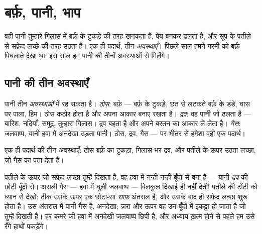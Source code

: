 \chapter{बर्फ़, पानी, भाप}\label{ch:g2:ice-water-steam}

वही पानी तुम्हारे गिलास में बर्फ़ के टुकड़े की तरह खनकता है, पेय बनकर
ढलता है, और सूप के पतीले से सफ़ेद लच्छे की तरह उठता है। एक ही पदार्थ,
तीन \emph{अवस्थाएँ}। पिछले साल हमने गरमी को बर्फ़ पिघलाते देखा था;
इस साल हम पानी की तीनों अवस्थाओं से मिलेंगे।

\section{पानी की तीन अवस्थाएँ}

\begin{example}\label{ex:g2:ice-water-steam:where}
पानी तीन \emph{अवस्थाओं} में रह सकता है। \emph{ठोस}: बर्फ़ ---
बर्फ़ के टुकड़े, छत से लटकते बर्फ़ के डंडे, घास पर पाला, हिम। ठोस
कठोर होता है और अपना आकार बनाए रखता है। \emph{द्रव}: वह पानी जो ढलता
है --- बारिश, नदियाँ, समुद्र, तुम्हारा गिलास। द्रव बहता है और अपने
बरतन का आकार ले लेता है। \emph{गैस}: जलवाष्प, यानी हवा में अनदेखा
उड़ता पानी। ठोस, द्रव, गैस --- पर भीतर से हमेशा वही एक पदार्थ।
\end{example}

\begin{omfigure}

{\small एक ही पदार्थ की तीन अवस्थाएँ: ठोस बर्फ़ का टुकड़ा, गिलास भर
द्रव, और पतीले के ऊपर उठता लच्छा, जो गैस का पता देता है।}
\end{omfigure}

\begin{remark}\label{rem:g2:ice-water-steam:invisible}
पतीले के ऊपर जो सफ़ेद लच्छा तुम्हें दिखता है, वह हवा में 
नन्ही-नन्ही बूँदों से बना है --- यानी \emph{द्रव} की छोटी बूँदों से।
असली गैस --- हवा में घुली जलवाष्प --- बिलकुल दिखाई ही नहीं देती!
पतीले की टोंटी को ध्यान से देखो: ठीक उसके ऊपर एक छोटा-सा \emph{साफ़}
अंतराल है, और उसके बाद ही सफ़ेद लच्छा शुरू होता है। उस अंतराल में
पानी गैस है, अनदेखा; ज़रा और ऊपर वह उन बूँदों में इकट्ठा हो जाता है
जो तुम्हें दिखती हैं। हर कमरे की हवा में अनदेखी जलवाष्प छिपी है, और
अध्याय ख़त्म होने से पहले हम उसे रँगे हाथों पकड़ेंगे।
\end{remark}

